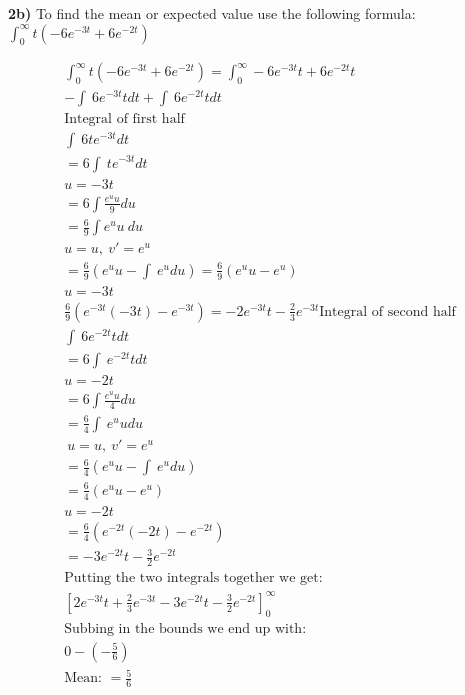 \documentclass[oneside, a4paper]{article}
\begin{document}
\textbf{2b)} To find the mean or expected value use the following formula:
$ \int_0^\infty t\left( -6e^{-3t} + 6e^{-2t} \right)$ 

\begin{equation}
    \begin{split}
        \int_0^\infty t\left( -6e^{-3t} + 6e^{-2t} \right)
            = \int_0^\infty -6e^{-3t}t+6e^{-2t}t \\
        -\int \:6e^{-3t}tdt+\int \:6e^{-2t}tdt \\
        \text{Integral of first half} \\
            \int \:6te^{-3t}dt \\
            = 6 \int \:te^{-3t}dt\\
            u = -3t \\
            = 6 \int \frac{e^uu}{9} du \\
            = \frac{6}{9} \int e^uu \: du \\
            u=u,\:v'=e^u \\
            = \frac{6}{9}\left(e^uu-\int \:e^udu\right) 
            = \frac{6}{9}\left(e^uu-e^u\right) \\
            u = -3t \\
            \frac{6}{9}\left(e^{-3t}\left(-3t\right)-e^{-3t}\right) 
            = -2e^{-3t}t-\frac{2}{3}e^{-3t}
        \text{Integral of second half} \\
            \int \:6e^{-2t}tdt \\
            = 6 \int \:e^{-2t}tdt \\
            u=-2t \\
            = 6 \int \frac{e^uu}{4}du \\
            = \frac{6}{4} \int \:e^uudu \\ 
            \:u=u,\:v'=e^u\\
            = \frac{6}{4}\left(e^uu-\int \:e^udu\right) \\
            = \frac{6}{4}\left(e^uu-e^u\right) \\
            u = -2t \\
            = \frac{6}{4}\left(e^{-2t}\left(-2t\right)-e^{-2t}\right) \\
            = -3e^{-2t}t-\frac{3}{2}e^{-2t} \\
        \text{Putting the two integrals together we get: } \\
        \left[2e^{-3t}t+\frac{2}{3}e^{-3t}-3e^{-2t}t-\frac{3}{2}e^{-2t}\right]^\infty_0 \\
        \text{Subbing in the bounds we end up with:} \\
        0-\left(-\frac{5}{6}\right) \\
        \text{Mean: } = \frac{5}{6}
    \end{split}
\end{equation}
\end{document}
